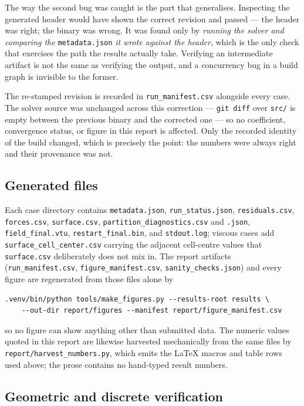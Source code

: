 The way the second bug was caught is the part that generalises. Inspecting the generated
header would have shown the correct revision and passed --- the header was right; the binary
was wrong. It was found only by \emph{running the solver and comparing the}
\texttt{metadata.json} \emph{it wrote against the header}, which is the only check that
exercises the path the results actually take. Verifying an intermediate artifact is not the
same as verifying the output, and a concurrency bug in a build graph is invisible to the
former.

The re-stamped revision is recorded in \texttt{run\_manifest.csv} alongside every case. The
solver source was unchanged across this correction --- \texttt{git diff} over \texttt{src/}
is empty between the previous binary and the corrected one --- so no coefficient, convergence
status, or figure in this report is affected. Only the recorded identity of the build
changed, which is precisely the point: the numbers were always right and their provenance was
not.

\subsection{Generated files}

Each case directory contains \texttt{metadata.json},
\texttt{run\_status.json}, \texttt{residuals.csv}, \texttt{forces.csv},
\texttt{surface.csv}, \texttt{partition\_diagnostics.csv} and
\texttt{.json}, \texttt{field\_final.vtu}, \texttt{restart\_final.bin}, and
\texttt{stdout.log}; viscous cases add
\texttt{surface\_cell\_center.csv} carrying the adjacent cell-centre values that
\texttt{surface.csv} deliberately does not mix in. The report artifacts
(\texttt{run\_manifest.csv}, \texttt{figure\_manifest.csv},
\texttt{sanity\_checks.json}) and every figure are regenerated from those files
alone by

\begin{verbatim}
.venv/bin/python tools/make_figures.py --results-root results \
    --out-dir report/figures --manifest report/figure_manifest.csv
\end{verbatim}

so no figure can show anything other than submitted data. The numeric values
quoted in this report are likewise harvested mechanically from the same files by
\texttt{report/harvest\_numbers.py}, which emits the LaTeX macros and table rows
used above; the prose contains no hand-typed result numbers.

\subsection{Geometric and discrete verification}

